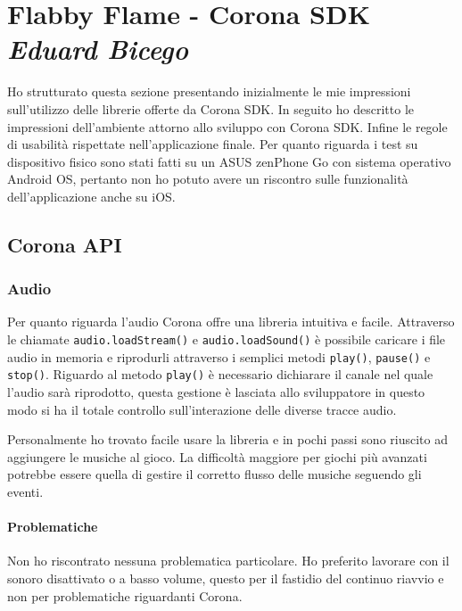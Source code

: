 \newpage
\section{Flabby Flame - Corona SDK\\ {\small \emph{Eduard Bicego}}}
\label{sec:corona}

	Ho strutturato questa sezione presentando inizialmente le mie impressioni sull'utilizzo delle librerie offerte da Corona SDK. In seguito ho descritto le impressioni dell'ambiente attorno allo sviluppo con Corona SDK. Infine le regole di usabilità rispettate nell'applicazione finale.
	Per quanto riguarda i test su dispositivo fisico sono stati fatti su un ASUS zenPhone Go con sistema operativo Android OS, pertanto non ho potuto avere un riscontro sulle funzionalità dell'applicazione anche su iOS.
	
	\subsection{Corona API}

	\subsubsection{Audio}
		Per quanto riguarda l'audio Corona offre una libreria intuitiva e facile. Attraverso le chiamate \verb|audio.loadStream()| e \verb|audio.loadSound()| è possibile caricare i file audio in memoria e riprodurli attraverso i semplici metodi \verb|play()|, \verb|pause()| e \verb|stop()|. Riguardo al metodo \verb|play()| è necessario dichiarare il canale nel quale l'audio sarà riprodotto, questa gestione è lasciata allo sviluppatore in questo modo si ha il totale controllo sull'interazione delle diverse tracce audio.
		
		Personalmente ho trovato facile usare la libreria e in pochi passi sono riuscito ad aggiungere le musiche al gioco. La difficoltà maggiore per giochi più avanzati potrebbe essere quella di gestire il corretto flusso delle musiche seguendo gli eventi.
		
		
		\paragraph{Problematiche}
			Non ho riscontrato nessuna problematica particolare. Ho preferito lavorare con il sonoro disattivato o a basso volume, questo per il fastidio del continuo riavvio e non per problematiche riguardanti Corona.
	
